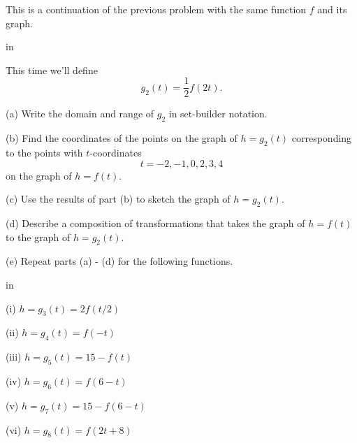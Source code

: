 \documentclass{ximera}
\newcommand{\pskip}{\vskip 0.1 in}
\begin{document}
\begin{question}  \label{Q:vvvcccc}
This is a continuation of the previous problem with the same function $f$ and its graph.

\pskip

This time we'll define 
\[
     g_2(t) = \frac{1}{2}f(2t) .
\]

(a) Write the domain and range of $g_2$ in set-builder notation.

(b) Find the coordinates of the points on the graph of $h=g_2(t)$ corresponding to the points with $t$-coordinates
\[
 t = -2, -1, 0, 2, 3, 4
\]
on the graph of $h=f(t)$.

(c) Use the results of part (b) to sketch the graph of $h=g_2(t)$.

(d) Describe a composition of transformations that takes the graph of $h=f(t)$ to the graph of $h=g_2(t)$.

(e) Repeat parts (a) - (d) for the following functions.

\pskip


(i)  $h=g_3(t) = 2f(t/2)$

(ii) $h = g_4(t) = f(-t)$

(iii) $h = g_5(t) = 15 - f(t)$

(iv) $h = g_6(t) = f(6-t)$

(v) $h = g_7(t) = 15 - f(6-t)$

(vi) $h=g_8(t) = f(2t+8)$



\end{question}
\end{document}
